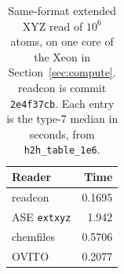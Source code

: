 \begin{table}[tbp]
\centering
\footnotesize
\setlength{\tabcolsep}{4pt}
\caption{Same-format extended XYZ read of \(10^{6}\) atoms, on one core of the Xeon in Section~\ref{sec:compute}.
readcon is commit \texttt{2e4f37cb}.
Each entry is the type-7 median in seconds, from \texttt{h2h\_table\_1e6}.}
\label{tab:h2h-main}
\small
\begin{tabular}{@{}lr@{}}
\toprule
Reader & Time \\
\midrule
readcon & 0.1695 \\
ASE \texttt{extxyz} & 1.942 \\
chemfiles & 0.5706 \\
OVITO & 0.2077 \\
\bottomrule
\end{tabular}
\end{table}
